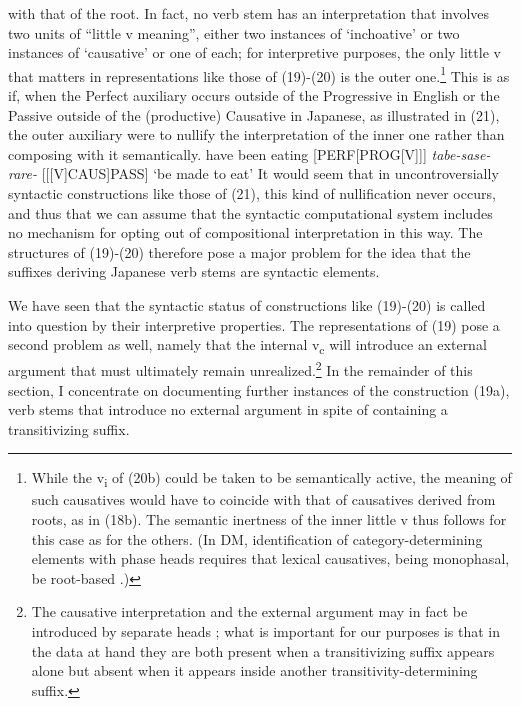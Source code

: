 \documentclass[output=paper,
modfonts
]{LSP/langsci}
\begin{document}
with that of the root. In fact, no verb stem has an interpretation that
involves two units of ``little v meaning'', either two instances of
`inchoative' or two instances of `causative' or one of each; for
interpretive purposes, the only little v that matters in representations
like those of (19)-(20) is the outer one.\footnote{While the
  v\textsubscript{i} of (20b) could be taken to be semantically active,
  the meaning of such causatives would have to coincide with that of
  causatives derived from roots, as in (18b). The semantic inertness of
  the inner little v thus follows for this case as for the others. (In
  DM, identification of category-determining elements with phase heads
  requires that lexical causatives, being monophasal, be root-based
  \citep{marantz2007a}.)} This is as if, when the Perfect auxiliary occurs
outside of the Progressive in English or the Passive outside of the
(productive) Causative in Japanese, as illustrated in (21), the outer
auxiliary were to nullify the interpretation of the inner one rather
than composing with it semantically.
\ea
	\ea have been eating { } {[}PERF{[}PROG{[}V{]}{]}{]}
	\ex \textit{tabe-sase-rare-} { } {[}{[}{[}V{]}CAUS{]}PASS{]} `be made to eat'
	\z
\z
It would seem that in uncontroversially syntactic constructions like
those of (21), this kind of nullification never occurs, and thus that we
can assume that the syntactic computational system includes no mechanism
for opting out of compositional interpretation in this way. The
structures of (19)-(20) therefore pose a major problem for the idea that
the suffixes deriving Japanese verb stems are syntactic elements.

We have seen that the syntactic status of constructions like (19)-(20)
is called into question by their interpretive properties. The
representations of (19) pose a second problem as well, namely that the
internal v\textsubscript{c} will introduce an external argument that
must ultimately remain unrealized.\footnote{The causative interpretation
  and the external argument may in fact be introduced by separate heads \citep[chapter 3]{pylkka2008a}; what is important for our purposes is that in the data at hand they are both present when a transitivizing
  suffix appears alone but absent when it appears inside another
  transitivity-determining suffix.} In the remainder of this section, I
concentrate on documenting further instances of the construction (19a),
verb stems that introduce no external argument in spite of containing a
transitivizing suffix.
\end{document}

